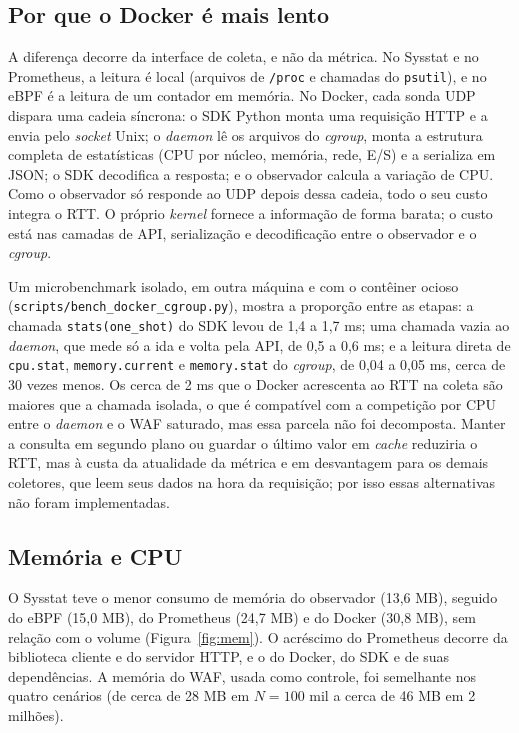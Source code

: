 \documentclass{ieeeaccess}
\begin{document}
\subsection{Por que o Docker é mais lento}
A diferença decorre da interface de coleta, e não da métrica. No Sysstat e no Prometheus, a leitura é local (arquivos de \texttt{/proc} e chamadas do \texttt{psutil}), e no eBPF é a leitura de um contador em memória. No Docker, cada sonda UDP dispara uma cadeia síncrona: o SDK Python monta uma requisição HTTP e a envia pelo \textit{socket} Unix; o \textit{daemon} lê os arquivos do \textit{cgroup}, monta a estrutura completa de estatísticas (CPU por núcleo, memória, rede, E/S) e a serializa em JSON; o SDK decodifica a resposta; e o observador calcula a variação de CPU. Como o observador só responde ao UDP depois dessa cadeia, todo o seu custo integra o RTT. O próprio \textit{kernel} fornece a informação de forma barata; o custo está nas camadas de API, serialização e decodificação entre o observador e o \textit{cgroup}.

Um microbenchmark isolado, em outra máquina e com o contêiner ocioso (\texttt{scripts/bench\_docker\_cgroup.py}), mostra a proporção entre as etapas: a chamada \texttt{stats(one\_shot)} do SDK levou de 1,4 a 1,7 ms; uma chamada vazia ao \textit{daemon}, que mede só a ida e volta pela API, de 0,5 a 0,6 ms; e a leitura direta de \texttt{cpu.stat}, \texttt{memory.current} e \texttt{memory.stat} do \textit{cgroup}, de 0,04 a 0,05 ms, cerca de 30 vezes menos. Os cerca de 2 ms que o Docker acrescenta ao RTT na coleta são maiores que a chamada isolada, o que é compatível com a competição por CPU entre o \textit{daemon} e o WAF saturado, mas essa parcela não foi decomposta. Manter a consulta em segundo plano ou guardar o último valor em \textit{cache} reduziria o RTT, mas à custa da atualidade da métrica e em desvantagem para os demais coletores, que leem seus dados na hora da requisição; por isso essas alternativas não foram implementadas.

\subsection{Memória e CPU}
O Sysstat teve o menor consumo de memória do observador (13,6 MB), seguido do eBPF (15,0 MB), do Prometheus (24,7 MB) e do Docker (30,8 MB), sem relação com o volume (Figura~\ref{fig:mem}). O acréscimo do Prometheus decorre da biblioteca cliente e do servidor HTTP, e o do Docker, do SDK e de suas dependências. A memória do WAF, usada como controle, foi semelhante nos quatro cenários (de cerca de 28 MB em $N=100$ mil a cerca de 46 MB em 2 milhões).
\end{document}
